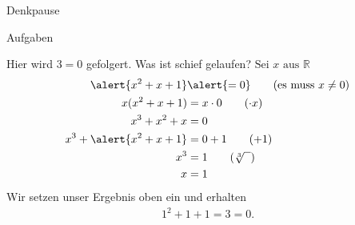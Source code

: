%
%
%
%


{
	\begin{frame}[fragile]{Denkpause}
		\begin{alertblock}{Aufgaben}
		\small{
			\begin{block}{Hier wird $3=0$ gefolgert. Was ist schief gelaufen?}
				$\text{Sei }x\text{ aus }\mathbb{R}$
				\begin{align*}
					\alert{x^2 + x + 1} &\alert{= 0} \tag{es muss $x\neq0$}\\
					x(x^2 + x + 1) &= x \cdot 0 \tag{$\cdot x$}\\
					x^3 + x^2 + x &= 0\\
					x^3 + \alert{x^2 + x + 1} &= 0 + 1\tag{$+ 1$}\\
					x^3 &= 1\tag{$\sqrt[3]{\phantom{x}}$}\\
					x &= 1
				\end{align*}
				Wir setzen unser Ergebnis oben ein und erhalten
				\begin{align*}
					1^2 + 1 + 1= 3 = 0\text{.}
				\end{align*}
			\end{block}
		}
		\end{alertblock}
	\end{frame}
}

